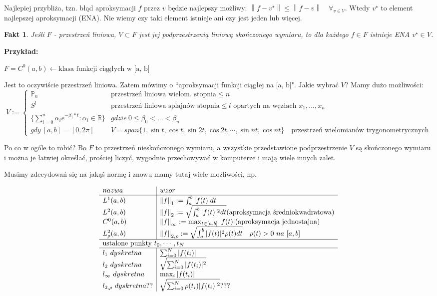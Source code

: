 \documentclass[hidelinks,a4paper,fleqn,oneside]{book}
\newcommand{\RR}{\mathbb{R}}
\newcommand{\la}{\leftarrow}
\newcommand{\norm}[1]{\left\lVert#1\right\rVert}
\newtheorem{fakt}{Fakt}
\begin{document}
Najlepiej przybliża, tzn. błąd aproksymacji $f$ przez $v$ będzie najlepszy możliwy: $\norm{f-v^\star} \leq \norm{f-v} \quad \forall_{v \in V}$. Wtedy $v^\star$ to element najlepszej aproksymacji (ENA). Nie wiemy czy taki element istnieje ani czy jest jeden lub więcej.

\begin{fakt} Jeśli $F$ - przestrzeń liniowa, $V \subset F$ jest jej podprzestrzenią liniową skończonego wymiaru, to dla każdego $f \in F$ istnieje ENA $v^\star \in V$.\end{fakt}

\textbf{Przykład:}

$F = C^0(a, b) \la \textrm{klasa funkcji ciągłych w [a, b]}$

Jest to oczywiście przestrzeń liniowa. Zatem mówimy o ``aproksymacji funkcji ciągłej na [a, b]". Jakie wybrać $V$? Mamy dużo możliwości:
\[
	V := \left\{ \begin{array}{ll}
		\mathbb{P}_n & \textrm{przestrzeń liniowa wielom. stopnia} \leq n \\
		S^l & \textrm{przestrzeń liniowa splajnów stopnia} \leq l\textrm{ opartych na węzłach }x_1, ..., x_n\\
		\{\sum_{i=0}^{n} \alpha_i e^{-\beta_j * t} : \alpha_i \in \RR\} & gdzie\ 0 \leq \beta_0 < ... < \beta_n \\
		gdy\ [a, b] = [0, 2\pi] & V = span\{1, \sin{t}, \cos{t}, \sin{2t}, \cos{2t}, \cdots, \sin{nt}, \cos{nt} \} \quad \textrm{przestrzeń wielomianów trygonometrycznych}
   \end{array}\right.
\]

Po co w ogóle to robić? Bo $F$ to przestrzeń nieskończonego wymiaru, a wszystkie przedstawione podprzestrzenie $V$ są skończonego wymiaru i można je łatwiej określać, prościej liczyć, wygodnie przechowywać w komputerze i mają wiele innych zalet.

Musimy zdecydowań się na jakąś normę i znowu mamy tutaj wiele możliwości, np.

\[
	\begin{array}{l|l}
		nazwa & wzor \\ \hline
		L^1(a, b) & \norm{f}_1 := \int_a^b |f(t)| dt \\
		L^2(a, b) & \norm{f}_2 := \sqrt{\int_a^b |f(t)|^2 dt} \textrm{(aproksymacja średniokwadratowa)} \\
		C^0(a, b) & \norm{f}_\infty := \max_{t \in [a, b]} |f(t)| \textrm{(aproksymacja jednostajna)}\\
		L^2_\rho(a, b) & \norm{f}_{2, \rho} := \sqrt{\int_a^b |f(t)|^2 \rho(t) dt} \quad \rho(t) > 0\ na\ [a, b] \\ \hline
		\multicolumn{2}{l}{\textrm{ustalone punkty }t_0, \cdots, t_N} \\ \hline
		l_1\ dyskretna & \sum_{i=0}^N |f(t_i)| \\
		l_2\ dyskretna & \sqrt{\sum_{i=0}^N |f(t_i)|^2} \\
		l_\infty\ dyskretna & \max_{i} |f(t_i)| \\
		l_{2,\rho}\ dyskretna ?? & \sqrt{\sum_{i=0}^N \rho(t_i) |f(t_i)|^2} ???
	\end{array}
\]
\end{document}
